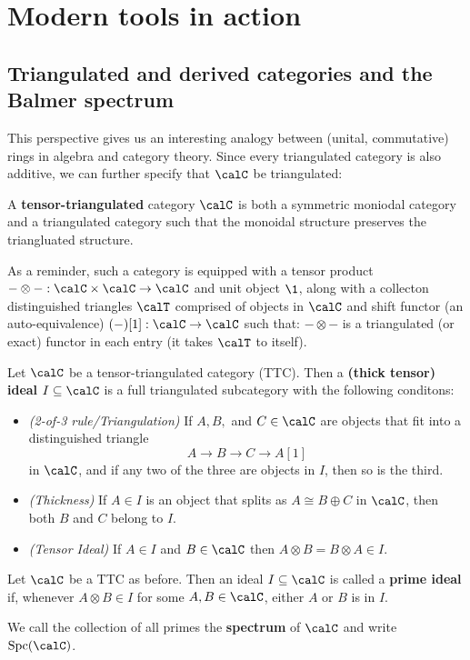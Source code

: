 \documentclass[12pt]{article}
\begin{document}
\section{Modern tools in action}
	\subsection{Triangulated and derived categories and the Balmer spectrum}
	This perspective gives us an interesting analogy between (unital, commutative) rings in algebra and category theory. Since every 
	triangulated category is also additive, we can further specify that $\calC$ be triangulated:
	\begin{defn}
		A \textbf{tensor-triangulated} category $\calC$ is both a symmetric moniodal category and a triangulated category such that 
		the monoidal structure preserves the triangluated structure. 

		As a reminder, such a category is equipped with a tensor product $-\otimes -:\calC\times\calC\to \calC$ and unit object $\1$, along with
		a collecton distinguished triangles $\calT$ comprised of objects in $\calC$ and shift functor (an auto-equivalence) $(-)[1]:\calC\to \calC$ such that:
		$-\otimes-$ is a triangulated (or exact) functor in each entry (it takes $\calT$ to itself).
	\end{defn}
	\begin{defn}
		Let $\calC$ be a tensor-triangulated category (TTC). Then a \textbf{(thick tensor) ideal} $I\subseteq \calC$ is a full triangulated subcategory 
		with the following conditons:
		\begin{itemize}
			\item \textit{(2-of-3 rule/Triangulation)} If $A,B,$ and $C\in\calC$ are objects that fit into a distinguished triangle
			\[A\to B\to C\to A[1]\]
			in $\calC$, and if any two of the three are objects in $I$, then so is the third.
			\item \textit{(Thickness)} If $A\in I$ is an object that splits as $A\cong B\oplus C$ in $\calC$, then both $B$ and $C$ belong to $I$.
			\item \textit{(Tensor Ideal)} If $A\in I$ and $B\in \calC$ then $A\otimes B=B\otimes A\in I$.
		\end{itemize}
	\end{defn}
	\begin{defn}
		Let $\calC$ be a TTC as before. Then an ideal $I\subseteq\calC$ is called a \textbf{prime ideal}
		if, whenever $A\otimes B\in I$ for some $A,B\in \calC$, either $A$ or $B$ is in $I$.
	
		We call the collection of all primes the \textbf{spectrum} of $\calC$ and write 
		$\operatorname{Spc}(\calC)$.
	\end{defn}
\end{document}
